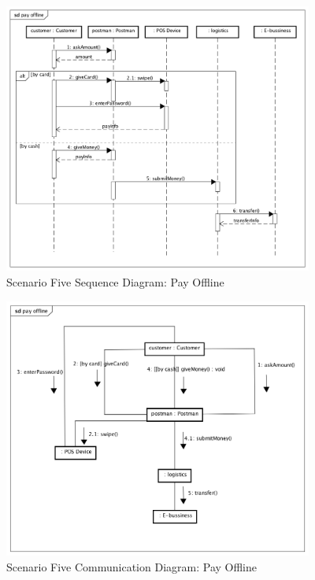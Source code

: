 \documentclass[12pt]{scrreprt}
\begin{document}
\begin{figure}[H]
  \centering\includegraphics[width=4in]{DocumentRes/5SequenceDiagram_payOffline.png}
  \caption{Scenario Five Sequence Diagram: Pay Offline}
\end{figure}
\begin{figure}[H]
  \centering\includegraphics[width=4in]{DocumentRes/5CommunicationDiagram_payOffline.png}
  \caption{Scenario Five Communication Diagram: Pay Offline}
\end{figure}
\end{document}
